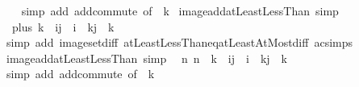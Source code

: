 \begin{isabellebody}
%
\isadelimproof
\ \ %
\endisadelimproof
%
\isatagproof
{}\isamarkupfalse%
\ {\isacharparenleft}{\kern0pt}simp\ add{\isacharcolon}{\kern0pt}\ add{\isachardot}{\kern0pt}commute\ {\isacharbrackleft}{\kern0pt}of\ {\isacharunderscore}{\kern0pt}\ k{\isacharbrackright}{\kern0pt}{\isacharparenright}{\kern0pt}%
\endisatagproof
{\isafoldproof}%
%
\isadelimproof
\isanewline
%
\endisadelimproof
\isanewline
{}\isamarkupfalse%
\ image{\isacharunderscore}{\kern0pt}add{\isacharunderscore}{\kern0pt}atLeastLessThan\ {\isacharbrackleft}{\kern0pt}simp{\isacharbrackright}{\kern0pt}{\isacharcolon}{\kern0pt}\isanewline
\ \ {\isachardoublequoteopen}plus\ k\ {\isacharbackquote}{\kern0pt}\ {\isacharbraceleft}{\kern0pt}i{\isachardot}{\kern0pt}{\isachardot}{\kern0pt}{\isacharless}{\kern0pt}j{\isacharbraceright}{\kern0pt}\ {\isacharequal}{\kern0pt}\ {\isacharbraceleft}{\kern0pt}i\ {\isacharplus}{\kern0pt}\ k{\isachardot}{\kern0pt}{\isachardot}{\kern0pt}{\isacharless}{\kern0pt}j\ {\isacharplus}{\kern0pt}\ k{\isacharbraceright}{\kern0pt}{\isachardoublequoteclose}\isanewline
%
\isadelimproof
\ \ %
\endisadelimproof
%
\isatagproof
{}\isamarkupfalse%
\ {\isacharparenleft}{\kern0pt}simp\ add{\isacharcolon}{\kern0pt}\ image{\isacharunderscore}{\kern0pt}set{\isacharunderscore}{\kern0pt}diff\ atLeastLessThan{\isacharunderscore}{\kern0pt}eq{\isacharunderscore}{\kern0pt}atLeastAtMost{\isacharunderscore}{\kern0pt}diff\ ac{\isacharunderscore}{\kern0pt}simps{\isacharparenright}{\kern0pt}%
\endisatagproof
{\isafoldproof}%
%
\isadelimproof
\isanewline
%
\endisadelimproof
\isanewline
{}\isamarkupfalse%
\ image{\isacharunderscore}{\kern0pt}add{\isacharunderscore}{\kern0pt}atLeastLessThan{\isacharprime}{\kern0pt}\ {\isacharbrackleft}{\kern0pt}simp{\isacharbrackright}{\kern0pt}{\isacharcolon}{\kern0pt}\isanewline
\ \ {\isachardoublequoteopen}{\isacharparenleft}{\kern0pt}{\isasymlambda}n{\isachardot}{\kern0pt}\ n\ {\isacharplus}{\kern0pt}\ k{\isacharparenright}{\kern0pt}\ {\isacharbackquote}{\kern0pt}\ {\isacharbraceleft}{\kern0pt}i{\isachardot}{\kern0pt}{\isachardot}{\kern0pt}{\isacharless}{\kern0pt}j{\isacharbraceright}{\kern0pt}\ {\isacharequal}{\kern0pt}\ {\isacharbraceleft}{\kern0pt}i\ {\isacharplus}{\kern0pt}\ k{\isachardot}{\kern0pt}{\isachardot}{\kern0pt}{\isacharless}{\kern0pt}j\ {\isacharplus}{\kern0pt}\ k{\isacharbraceright}{\kern0pt}{\isachardoublequoteclose}\isanewline
%
\isadelimproof
\ \ %
\endisadelimproof
%
\isatagproof
{}\isamarkupfalse%
\ {\isacharparenleft}{\kern0pt}simp\ add{\isacharcolon}{\kern0pt}\ add{\isachardot}{\kern0pt}commute\ {\isacharbrackleft}{\kern0pt}of\ {\isacharunderscore}{\kern0pt}\ k{\isacharbrackright}{\kern0pt}{\isacharparenright}{\kern0pt}%

\end{isabellebody}
